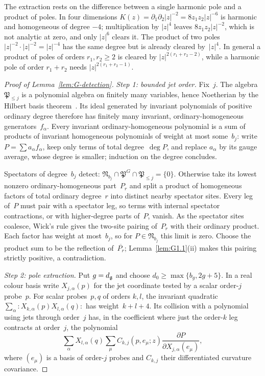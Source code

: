 The extraction rests on the difference between a single harmonic pole and a product of poles. In four dimensions $K(z)=\partial_1\partial_2|z|^{-2}=8z_1z_2|z|^{-6}$ is harmonic and homogeneous of degree $-4$; multiplication by $|z|^{4}$ leaves $8z_1z_2|z|^{-2}$, which is not analytic at zero, and only $|z|^{6}$ clears it. The product of two poles $|z|^{-2}\cdot|z|^{-2}=|z|^{-4}$ has the same degree but is already cleared by~$|z|^4$. In general a product of poles of orders $r_1,r_2\ge2$ is cleared by $|z|^{2(r_1+r_2-2)}$, while a harmonic pole of order $r_1+r_2$ needs $|z|^{2(r_1+r_2-1)}$.
\begin{proof}[Proof of Lemma~\ref{lem:G-detection}]
\emph{Step 1: bounded jet order.} Fix~$j$. The algebra~$\mathfrak P_{\le j}$ is a polynomial algebra on finitely many variables, hence Noetherian by the Hilbert basis theorem~\cite[Lemma~10.31.1]{Stacks2026}. Its ideal generated by invariant polynomials of positive ordinary degree therefore has finitely many invariant, ordinary-homogeneous generators~$f_\alpha$. Every invariant ordinary-homogeneous polynomial is a sum of products of invariant homogeneous polynomials of weight at most some~$b_j$: write $P=\sum a_\alpha f_\alpha$, keep only terms of total degree~$\deg P$, and replace $a_\alpha$ by its gauge average, whose degree is smaller; induction on the degree concludes.

Spectators of degree~$b_j$ detect: $\mathfrak N_{b_j}\cap\mathfrak P^G\cap\mathfrak P_{\le j}=\{0\}$. Otherwise take its lowest nonzero ordinary-homogeneous part~$P_r$ and split a product of homogeneous factors of total ordinary degree~$r$ into distinct nearby spectator sites. Every leg of~$P$ must pair with a spectator leg, so terms with internal spectator contractions, or with higher-degree parts of~$P$, vanish. As the spectator sites coalesce, Wick's rule gives the two-site pairing of~$P_r$ with their ordinary product. Each factor has weight at most~$b_j$, so for $P\in\mathfrak N_{b_j}$ this limit is zero. Choose the product sum to be the reflection of~$\overline{P_r}$; Lemma~\ref{lem:G1.1}(ii) makes this pairing strictly positive, a contradiction.

\emph{Step 2: pole extraction.} Put $g=d_{\mathfrak{g}}$ and choose $d_0\ge\max\{b_g,2g+5\}$. In a real colour basis write $X_{j,\alpha}(p)$ for the jet coordinate tested by a scalar order-$j$ probe~$p$. For scalar probes~$p,q$ of orders $k,l$, the invariant quadratic $\sum_\alpha{:}X_{k,\alpha}(p)X_{l,\alpha}(q){:}$ has weight~$k+l+4$. Its collision with a polynomial using jets through order~$j$ has, in the coefficient where just the order-$k$ leg contracts at order~$j$, the polynomial
\begin{equation}\label{eq:G-collision}
\sum_\alpha X_{l,\alpha}(q)\sum_\mu
C_{k,j}(p,e_\mu;z)\frac{\partial P}{\partial X_{j,\alpha}(e_\mu)},
\end{equation}
where $(e_\mu)$ is a basis of order-$j$ probes and $C_{k,j}$ their differentiated curvature covariance.


\end{proof}
